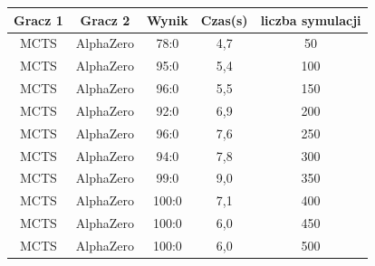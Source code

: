       \begin{longtable}{|c|c|c|c|c|}
        \hline
        \textbf{Gracz 1} & \textbf{Gracz 2} & \textbf{Wynik} & \textbf{Czas(s)} & \textbf{liczba symulacji} \\ \hline
        MCTS & AlphaZero & 78:0 & 4,7 & 50 \\ \hline
        MCTS & AlphaZero & 95:0 & 5,4 & 100 \\ \hline
        MCTS & AlphaZero & 96:0 & 5,5 & 150 \\ \hline
        MCTS & AlphaZero & 92:0 & 6,9 & 200 \\ \hline
        MCTS & AlphaZero & 96:0 & 7,6 & 250 \\ \hline
        MCTS & AlphaZero & 94:0 & 7,8 & 300 \\ \hline
        MCTS & AlphaZero & 99:0 & 9,0 & 350 \\ \hline
        MCTS & AlphaZero & 100:0 & 7,1 & 400 \\ \hline
        MCTS & AlphaZero & 100:0 & 6,0 & 450 \\ \hline
        MCTS & AlphaZero & 100:0 & 6,0 & 500 \\ \hline
        \end{longtable}

